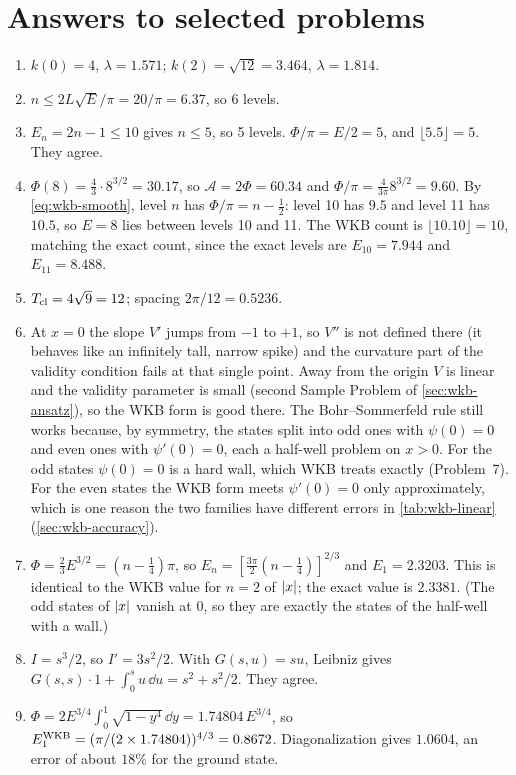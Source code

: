 \section{Answers to selected problems}\label{sec:wkb-answers}
\begin{enumerate}
\item[1.] $k(0)=4$, $\lambda=1.571$; $k(2)=\sqrt{12}=3.464$, $\lambda=1.814$.
\item[2.] $n\le2L\sqrt E/\pi=20/\pi=6.37$, so $6$ levels.
\item[3.] $E_n=2n-1\le10$ gives $n\le5$, so 5 levels. $\Phi/\pi=E/2=5$, and $\lfloor5.5\rfloor=5$. They agree.
\item[4.] $\Phi(8)=\frac43\cdot8^{3/2}=30.17$, so $\mathcal A=2\Phi=60.34$ and $\Phi/\pi=\frac{4}{3\pi}8^{3/2}=9.60$. By \cref{eq:wkb-smooth}, level $n$ has $\Phi/\pi=n-\frac12$: level 10 has $9.5$ and level 11 has $10.5$, so $E=8$ lies between levels 10 and 11. The WKB count is $\lfloor10.10\rfloor=10$, matching the exact count, since the exact levels are $E_{10}=7.944$ and $E_{11}=8.488$.
\item[5.] $T_{\rm cl}=4\sqrt9=12$; spacing $2\pi/12=0.5236$.
\item[6.] At $x=0$ the slope $V'$ jumps from $-1$ to $+1$, so $V''$ is not defined there (it behaves like an infinitely tall, narrow spike) and the curvature part of the validity condition fails at that single point. Away from the origin $V$ is linear and the validity parameter is small (second Sample Problem of \cref{sec:wkb-ansatz}), so the WKB form is good there. The Bohr--Sommerfeld rule still works because, by symmetry, the states split into odd ones with $\psi(0)=0$ and even ones with $\psi'(0)=0$, each a half-well problem on $x>0$. For the odd states $\psi(0)=0$ is a hard wall, which WKB treats exactly (Problem~7). For the even states the WKB form meets $\psi'(0)=0$ only approximately, which is one reason the two families have different errors in \cref{tab:wkb-linear} (\cref{sec:wkb-accuracy}).
\item[7.] $\Phi=\frac23E^{3/2}=(n-\frac14)\pi$, so $E_n=[\frac{3\pi}{2}(n-\frac14)]^{2/3}$ and $E_1=2.3203$. This is identical to the WKB value for $n=2$ of $\left\lvert x\right\rvert$; the exact value is $2.3381$. (The odd states of $\left\lvert x\right\rvert$ vanish at $0$, so they are exactly the states of the half-well with a wall.)
\item[9.] $I=s^3/2$, so $I'=3s^2/2$. With $G(s,u)=su$, Leibniz gives $G(s,s)\cdot1+\int_0^s u\,\dd u=s^2+s^2/2$. They agree.
\item[11.] $\Phi=2E^{3/4}\int_0^1\sqrt{1-y^4}\,\dd y=1.74804\,E^{3/4}$, so $E_1^{\rm WKB}=(\pi/(2\times1.74804))^{4/3}=0.8672$. Diagonalization gives $1.0604$, an error of about $18\%$ for the ground state.

\end{enumerate}
